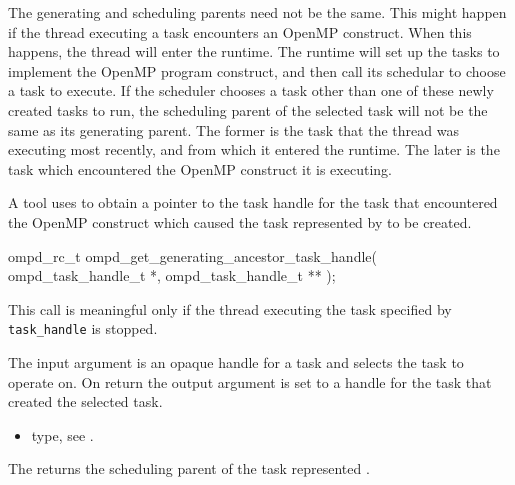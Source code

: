 The generating and scheduling parents need not be the same. This might happen if the thread 
executing a task encounters an OpenMP construct. When this happens, the thread will enter the 
runtime. The runtime will set up the tasks to implement the OpenMP program construct, and then 
call its schedular to choose a task to execute. If the scheduler chooses a task other than one of 
these newly created tasks to run, the scheduling parent of the selected task will not be the same 
as its generating parent. The former is the task that the thread was executing most recently,
and from which it entered the runtime. The later is the task which encountered the OpenMP 
construct it is executing.

\label{subsubsubsec:ompd_get_generating_ancestor_task_handle}
\summary
A tool uses  to obtain
a pointer to the task handle for the task that encountered the OpenMP construct which caused the 
task represented by  to be created.

\format

\begin{cspecific}
\begin{ompSyntax}
ompd_rc_t ompd_get_generating_ancestor_task_handle(
  ompd_task_handle_t *,
  ompd_task_handle_t **
);
\end{ompSyntax}
\end{cspecific}


\descr
This call is meaningful only if the thread executing the task specified by
\verb|task_handle|  is stopped.

\argdesc
The input argument  is an opaque handle for a task and selects the task to operate on.
On return the output argument  is set to a handle for the task
that created the selected task.

\crossreferences
\begin{itemize}
	\item {} type, see .
\end{itemize}


\label{subsubsubsec:ompd_get_scheduling_ancestor_task_handle}
\summary
The  returns the
scheduling parent of the task represented .

